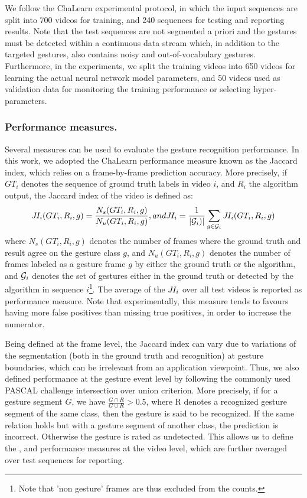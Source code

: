 We follow the ChaLearn experimental protocol, in which the input sequences are split into 700 videos for training, and 240 sequences for testing and reporting results.
Note that the   test sequences  are not segmented a priori and the gestures must be detected within a continuous data stream
which, in addition to the targeted gestures, also contains noisy and out-of-vocabulary gestures.
%
Furthermore, in the experiments, we split the training videos into 650 videos for learning the actual neural network model parameters, and 50 videos 
used as validation data for monitoring the training performance or selecting hyper-parameters.


\subsubsection{Performance measures.}

Several measures can be used to evaluate the gesture recognition performance.
%
In this work, we adopted the ChaLearn performance measure known as the Jaccard index, which relies on a frame-by-frame prediction accuracy. 
More precisely, if $GT_i$ denotes the sequence of ground truth labels in video $i$, and $R_i$ the algorithm output, the Jaccard index 
of the video is defined as:
\begin{equation}
\jaccardindex_i(GT_i, R_i,g) = \frac{N_s(GT_i, R_i,g)}{N_u(GT_i, R_i,g)}, 
\mbox{ and } \jaccardindex_i = \frac{1}{|{\cal G}_i)|} \sum_{g \in {\cal G}_i} \jaccardindex_i(GT_i, R_i,g)
\end{equation}
where $N_s(GT_i, R_i, g)$ denotes the number of frames where the ground truth and result agree on the gesture class $g$, 
and $N_u(GT_i, R_i, g)$ denotes the number of frames labeled as a gesture frame $g$ by  either the ground truth or the algorithm, 
and ${{\cal G}_i}$ denotes the set of gestures either in the ground truth or detected by the algorithm in sequence $i$\footnote{Note that 'non gesture' 
frames are thus excluded from the counts.}. The average of the $J\hspace*{-0.1em}I_i$ over all test videos is reported as performance measure.
%
Note that experimentally, this measure tends to favours having more false positives than missing true positives, in order to increase the numerator.

Being defined at the frame level, the Jaccard index can vary due to variations of the segmentation (both in the ground truth and recognition) 
at gesture boundaries, which can be irrelevant from an application viewpoint.
%
Thus, we also defined performance at the gesture event level by following the commonly used PASCAL challenge intersection over union criterion. 
More precisely, if for a gesture segment $G$, we have $\frac{G \cap R}{G \cup R} >  0.5$, where R denotes a recognized gesture 
segment of the same class, then the  gesture is said to be recognized.
%
If the same relation holds but with a gesture segment of another class, the prediction is incorrect.
Otherwise the gesture is rated as undetected. This allows us to define the \eventaccuracy, \eventconfused and \eventmissed performance measures at the video level, 
which are further averaged over test sequences for reporting.


